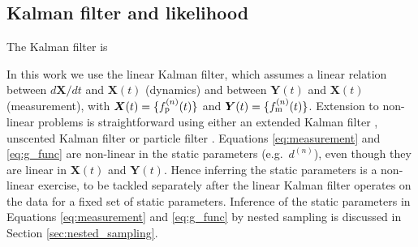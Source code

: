 \documentclass[fleqn,usenatbib,useAMS]{mnras}
\begin{document}
\subsection{Kalman filter and likelihood}\label{sec:kalman_filter}





The Kalman filter \citep{Kalman1} is 


 In this work we use the linear Kalman filter, which assumes a linear relation between $d{\boldsymbol{X}}/dt$ and ${\boldsymbol{X}}(t)$ (dynamics) and between ${\boldsymbol{Y}}(t)$ and ${\boldsymbol{X}}(t)$ (measurement), with ${\boldsymbol{X}}(t) = \{ f_{\rm p}^{(n)}(t) \}$ and ${\boldsymbol{Y}}(t) = \{ f_{\rm m}^{(n)}(t) \}$. Extension to non-linear problems is straightforward using either an extended Kalman filter \citep{zarchan2000fundamentals}, unscented Kalman filter \citep{882463van} or particle filter \citep{Simon10}. Equations \eqref{eq:measurement} and \eqref{eq:g_func} are non-linear in the static parameters (e.g.\ $d^{(n)}$), even though they are linear in ${\boldsymbol{X}}(t)$ and ${\boldsymbol{Y}}(t)$. Hence inferring the static parameters is a non-linear exercise, to be tackled separately after the linear Kalman filter operates on the data for a fixed set of static parameters. Inference of the static parameters in Equations \eqref{eq:measurement} and \eqref{eq:g_func} by nested sampling is discussed in Section \ref{sec:nested_sampling}. \newline 
\end{document}
